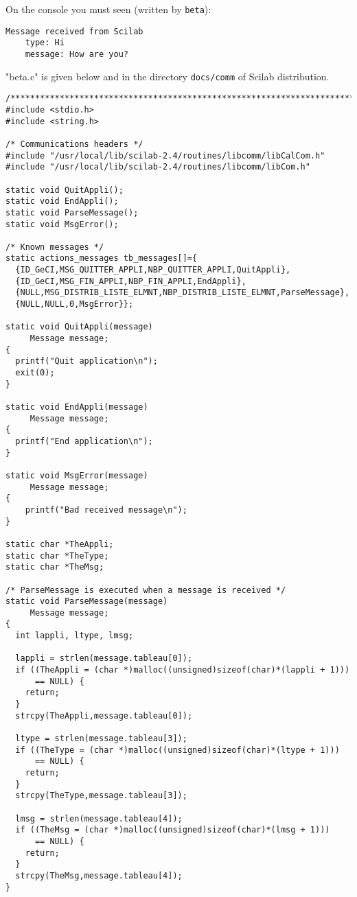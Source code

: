 \documentclass[11pt]{article}
\newcommand{\T}[1]{\texttt{#1}}
\begin{document}
On the console you must seen (written by \T{beta}):
\begin{verbatim}
Message received from Scilab
    type: Hi
    message: How are you?
\end{verbatim}

"beta.c" is given below and in the directory \T{docs/comm} of Scilab
distribution.

\begin{verbatim}
/***************************************************************************/
#include <stdio.h>
#include <string.h>

/* Communications headers */
#include "/usr/local/lib/scilab-2.4/routines/libcomm/libCalCom.h"
#include "/usr/local/lib/scilab-2.4/routines/libcomm/libCom.h"

static void QuitAppli();  
static void EndAppli();
static void ParseMessage();
static void MsgError();

/* Known messages */
static actions_messages tb_messages[]={
  {ID_GeCI,MSG_QUITTER_APPLI,NBP_QUITTER_APPLI,QuitAppli},
  {ID_GeCI,MSG_FIN_APPLI,NBP_FIN_APPLI,EndAppli},
  {NULL,MSG_DISTRIB_LISTE_ELMNT,NBP_DISTRIB_LISTE_ELMNT,ParseMessage},
  {NULL,NULL,0,MsgError}};

static void QuitAppli(message)
     Message message;
{  
  printf("Quit application\n");
  exit(0);
}

static void EndAppli(message) 
     Message message;
{
  printf("End application\n");
}

static void MsgError(message)
     Message message;
{
    printf("Bad received message\n");
}

static char *TheAppli;
static char *TheType;
static char *TheMsg;

/* ParseMessage is executed when a message is received */
static void ParseMessage(message)
     Message message;
{
  int lappli, ltype, lmsg;

  lappli = strlen(message.tableau[0]);
  if ((TheAppli = (char *)malloc((unsigned)sizeof(char)*(lappli + 1)))
      == NULL) {
    return;
  }
  strcpy(TheAppli,message.tableau[0]);

  ltype = strlen(message.tableau[3]);
  if ((TheType = (char *)malloc((unsigned)sizeof(char)*(ltype + 1)))
      == NULL) {
    return;
  }
  strcpy(TheType,message.tableau[3]);

  lmsg = strlen(message.tableau[4]);
  if ((TheMsg = (char *)malloc((unsigned)sizeof(char)*(lmsg + 1)))
      == NULL) {
    return;
  }
  strcpy(TheMsg,message.tableau[4]);
}


\end{verbatim}
\end{document}
